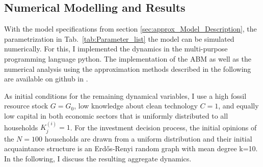    
\subsection{Numerical Modelling and Results} 
\label{sec:numerical_results}

With the model specifications from section \ref{sec:approx_Model_Description}, the parametrization in Tab.~\ref{tab:Parameter_list} the model can be simulated numerically.
For this, I implemented the dynamics in the multi-purpose programming language python. The implementation of the ABM as well as the numerical analysis using the approximation methods described in the following are available on github in \cite{kolb2018}.

As initial conditions for the remaining dynamical variables, I use a high fossil resource stock $G=G_0$, low knowledge about clean technology $C=1$, and equally low capital in both economic sectors that is uniformly distributed to all households $K_j^{(i)}=1$. For the investment decision process, the initial opinions of the $N=100$ households are drawn from a uniform distribution and their initial acquaintance structure is an Erd\H{o}s-Renyi random graph with mean degree k=10.
In the following, I discuss the resulting aggregate dynamics.



